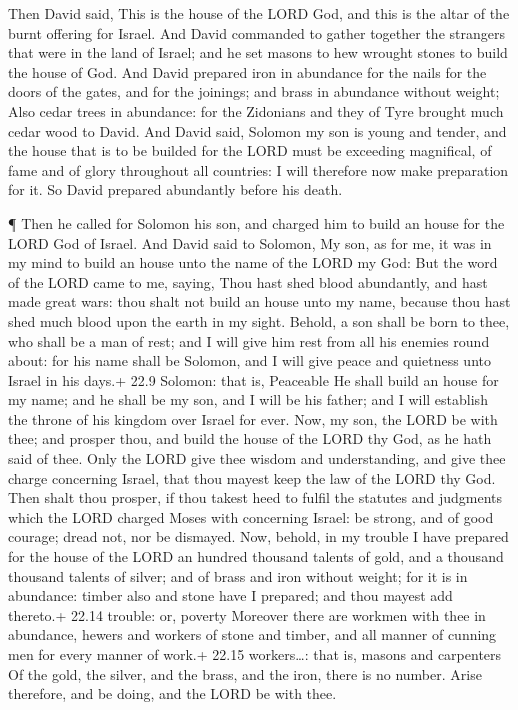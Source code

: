  Then David said, This is the house of the LORD God, and
this is the altar of the burnt offering for Israel.  And
David commanded to gather together the strangers that were in the land
of Israel; and he set masons to hew wrought stones to build the house of
God.  And David prepared iron in abundance for the nails for
the doors of the gates, and for the joinings; and brass in abundance
without weight;  Also cedar trees in abundance: for the
Zidonians and they of Tyre brought much cedar wood to David.
 And David said, Solomon my son is young and tender, and the
house that is to be builded for the LORD must be exceeding magnifical,
of fame and of glory throughout all countries: I will therefore now make
preparation for it. So David prepared abundantly before his death.

 ¶ Then he called for Solomon his son, and charged him to
build an house for the LORD God of Israel.  And David said
to Solomon, My son, as for me, it was in my mind to build an house unto
the name of the LORD my God:  But the word of the LORD came
to me, saying, Thou hast shed blood abundantly, and hast made great
wars: thou shalt not build an house unto my name, because thou hast shed
much blood upon the earth in my sight.  Behold, a son shall
be born to thee, who shall be a man of rest; and I will give him rest
from all his enemies round about: for his name shall be Solomon, and I
will give peace and quietness unto Israel in his days.+ 22.9 Solomon:
that is, Peaceable  He shall build an house for my name;
and he shall be my son, and I will be his father; and I will establish
the throne of his kingdom over Israel for ever.  Now, my
son, the LORD be with thee; and prosper thou, and build the house of the
LORD thy God, as he hath said of thee.  Only the LORD give
thee wisdom and understanding, and give thee charge concerning Israel,
that thou mayest keep the law of the LORD thy God.  Then
shalt thou prosper, if thou takest heed to fulfil the statutes and
judgments which the LORD charged Moses with concerning Israel: be
strong, and of good courage; dread not, nor be dismayed. 
Now, behold, in my trouble I have prepared for the house of the LORD an
hundred thousand talents of gold, and a thousand thousand talents of
silver; and of brass and iron without weight; for it is in abundance:
timber also and stone have I prepared; and thou mayest add thereto.+
22.14 trouble: or, poverty  Moreover there are workmen with
thee in abundance, hewers and workers of stone and timber, and all
manner of cunning men for every manner of work.+ 22.15 workers\ldots:
that is, masons and carpenters  Of the gold, the silver,
and the brass, and the iron, there is no number. Arise therefore, and be
doing, and the LORD be with thee.

